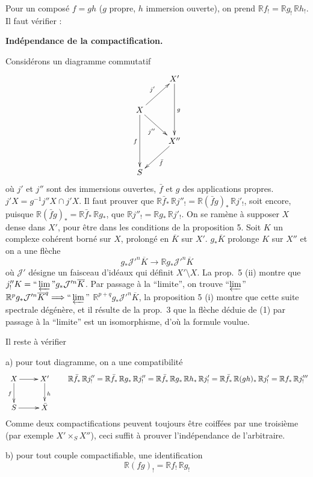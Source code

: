\documentclass[12pt]{amsart}
\theoremstyle{plain}
\theoremstyle{definition}
\newcommand{\cJ}{\mathcal{J}}
\newcommand{\bR}{\mathbb{R}}
\begin{document}
Pour un compos\'e $f = gh$ ($g$ propre, $h$ immersion ouverte), on prend $\bR f_{!} = \bR g_{!}\,\bR h_{!}$. Il faut v\'erifier :

\medskip

\textbf{Ind\'ependance de la compactification.}

Consid\'erons un diagramme commutatif
\[
\xymatrix{
& X' \ar[dd]^{g} \\
X \ar[ur]^{j'} \ar[dr]_{j''} \ar[dd]_{f} & \\
& X'' \ar[dl]^{\bar{f}} \\
S &
}
\]
o\`u $j'$ et $j''$ sont des immersions ouvertes, $\bar{f}$ et $g$ des applications propres. $j'X = g^{-1}j''X \cap j'X$. Il faut prouver que $\bR\bar{f}_{*}\,\bR j''_{!} = \bR(\bar{f}g)_{*}\,\bR j'_{!}$, soit encore, puisque $\bR(\bar{f}g)_{*} = \bR\bar{f}_{*}\,\bR g_{*}$, que $\bR j''_{!} = \bR g_{*}\,\bR j'_{!}$. On se ram\`ene \`a supposer $X$ dense dans $X'$, pour \^etre dans les conditions de la proposition 5. Soit $K$ un complexe coh\'erent born\'e sur $X$, prolong\'e en $\overline{K}$ sur $X'$. $g_{*}\overline{K}$ prolonge $K$ sur $X''$ et on a une fl\`eche
\begin{equation}
g_{*}\cJ'^{n}\overline{K} \to \bR g_{*}\cJ'^{n}\overline{K}
\end{equation}
o\`u $\cJ'$ d\'esigne un faisceau d'id\'eaux qui d\'efinit $X' \setminus X$. La prop.\ 5 (ii) montre que $j''_{!}K = \text{``}\varprojlim\text{''} g_{*}\cJ'^{n}\overline{K}$. Par passage \`a la ``limite'', on trouve ``$\varprojlim$'' $\bR^{p}g_{*}\cJ'^{n}\overline{K}^{q} \Longrightarrow \text{``}\varprojlim\text{''}$ $\bR^{p+q}g_{*}\cJ'^{n}\overline{K}$, la proposition 5 (i) montre que cette suite spectrale d\'eg\'en\`ere, et il r\'esulte de la prop.\ 3 que la fl\`eche d\'eduie de (1) par passage \`a la ``limite'' est un isomorphisme, d'o\`u la formule voulue.

Il reste \`a v\'erifier

a) pour tout diagramme, on a une compatibilit\'e
\[
\xymatrix{
X \ar[r] \ar[d]_{f} & X' \ar[d]^{h} \\
S \ar[r] & \bar{X}
}
\qquad
\bR\bar{f}_{*}\,\bR j''_{!} = \bR\bar{f}_{*}\,\bR g_{*}\,\bR j''_{!} = \bR\bar{f}_{*}\,\bR g_{*}\,\bR h_{*}\,\bR j'_{!} = \bR\bar{f}_{*}\,\bR(gh)_{*}\,\bR j'_{!} = \bR f_{*}\,\bR j'''_{!}
\]
Comme deux compactifications peuvent toujours \^etre coiff\'ees par une troisi\`eme (par exemple $X' \times_{S} X''$), ceci suffit \`a prouver l'ind\'ependance de l'arbitraire.

b) pour tout couple compactifiable, une identification
\[
\bR(fg)_{!} = \bR f_{!}\,\bR g_{!}
\]
\end{document}
